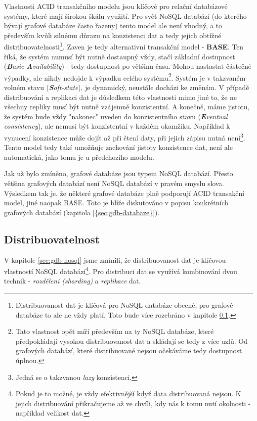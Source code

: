 Vlastnosti ACID transakčního modelu jsou klíčové pro relační databázové systémy, které mají širokou škálu využití. Pro svět NoSQL databází (do kterého bývají grafové databáze často řazeny) tento model ale není vhodný, a to především kvůli silnému důrazu na konzistenci dat a tedy jejich obtížné distribuovatelnosti\footnote{Distribuovanost dat je klíčová pro NoSQL databáze obecně, pro grafové databáze to ale ne vždy platí. Toto bude více rozebráno v kapitole \ref{sec:gdb-distribution}.}. Zaven je tedy alternativní transakční model - \textbf{BASE}. Ten říká, že systém numusí být nutně dostaupný vždy, stačí základní dostupnost (\textit{\textbf{B}asic \textbf{A}vailability}) - tedy dostupnost po většinu času. Mohou nastastat částečné výpadky, ale nikdy nedojde k výpadku celého systému\footnote{Tato vlastnost opět míří především na ty NoSQL databáze, které předpokládají vysokou distribuovanost dat a skládají se tedy z více uzlů. Od grafových databází, které distribuované nejsou očekáváme tedy dostupnost úplnou.}. Systém je v takzvaném volném stavu (\textit{\textbf{S}oft-state}), je dynamický, neustále docházi ke změnám. V případě distribuování a replikaci dat je důsledkem této vlastnosti mimo jiné to, že ne všechny repliky musí být nutně vzájemně konzistentní. A konečně, máme jistotu, že systém bude vždy "nakonec" uveden do konzistentního stavu (\textit{\textbf{E}ventual consistency}), ale nemusí být konzistentní v každém okamžiku. Například k vynucení konzistence může dojít až při čtení daty, při jejich zápisu nutná není\footnote{Jedná se o takzvanou \textit{lazy} konzistenci.}. Tento model tedy také umožňuje zachování jistoty konzistence dat, není ale automatická, jako tomu je u předchozího modelu.

Jak už bylo zmíněno, grafové databáze jsou typem NoSQL databází. Přesto většina grafových databází není NoSQL databází v pravém smyslu slova. Výsledkem tak je, že některé grafové databáze plně podporují ACID transakční model, jiné naopak BASE. Toto je blíže diskutováno v popisu konkrétních grafových databází (kapitola \ref{{sec:gdb-databaze}}). %



\subsection{Distribuovatelnost}
\label{sec:gdb-distribution}
V kapitole \ref{sec:gdb-nosql} jsme zmínili, že distribuovanost dat je klíčovou vlastností NoSQL databází\footnote{Pokud je to možné, je vždy efektivnější když data distribuovaná nejsou. K jejich distribuování přikračujeme až ve chvíli, kdy nás k tomu nutí okolnosti - například velikost dat.}. Pro distribuci dat se využívá kombinování dvou technik - \textit{rozdělení (sharding)} a \textit{replikace} dat. 

